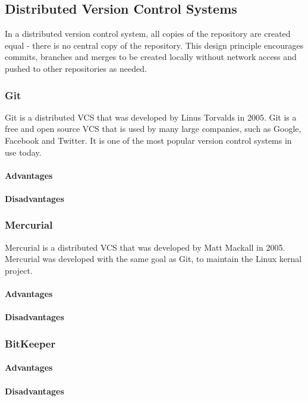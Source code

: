 \subsection{Distributed Version Control Systems}
In a distributed version control system, all copies of the repository are created equal - there is no central copy of the repository. This design principle encourages commits, branches and merges to be created locally without network access and pushed to other repositories as needed.
\subsubsection{Git}
Git is a distributed VCS that was developed by Linus Torvalds in 2005. Git is a free and open source VCS that is used by many large companies, such as Google, Facebook and Twitter. It is one of the most popular version control systems in use today.
\paragraph{Advantages}
\paragraph{Disadvantages}
\subsubsection{Mercurial}
Mercurial is a distributed VCS that was developed by Matt Mackall in 2005. Mercurial was developed with the same goal as Git, to maintain the Linux kernal project.
\paragraph{Advantages}
\paragraph{Disadvantages}
\subsubsection{BitKeeper}
\paragraph{Advantages}
\paragraph{Disadvantages}
